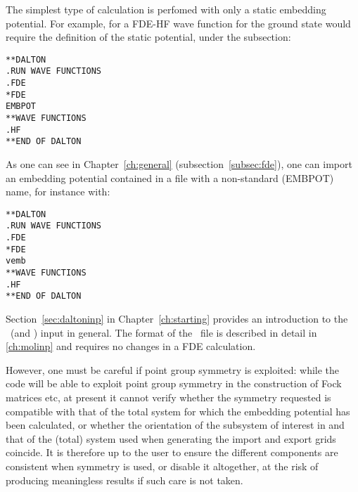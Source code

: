 The simplest type of calculation is perfomed with only a static embedding potential. For example, 
for a FDE-HF wave function for the ground state would require the definition of the static potential,
under the  subsection:
\begin{verbatim}
**DALTON
.RUN WAVE FUNCTIONS
.FDE
*FDE
EMBPOT
**WAVE FUNCTIONS
.HF
**END OF DALTON
\end{verbatim}
As one can see in Chapter~\ref{ch:general} (subsection~\ref{subsec:fde}),
one can import an embedding potential contained in a file with a non-standard (EMBPOT) name, for instance
with: 
\begin{verbatim}
**DALTON
.RUN WAVE FUNCTIONS
.FDE
*FDE
vemb
**WAVE FUNCTIONS
.HF
**END OF DALTON
\end{verbatim}

Section~\ref{sec:daltoninp} in Chapter~\ref{ch:starting} provides an introduction to the \dalton\ (and \molinp) 
input in general. The format of the \molinp\ file is described in detail in \ref{ch:molinp} and requires no
changes in a FDE calculation. 

However, one must be careful if point group symmetry is exploited: while the code will be able to exploit point group 
symmetry in the construction of Fock matrices etc, at present it cannot verify whether the symmetry requested is 
compatible with that of the total system for which the embedding potential has been calculated, or whether  
the orientation of the subsystem of interest in {\dalton} and that of the (total) system used when generating the import 
and export grids coincide. It is therefore up to the user to ensure the different components are consistent
when symmetry is used, or disable it altogether, at the risk of producing meaningless results if such care is not
taken.

